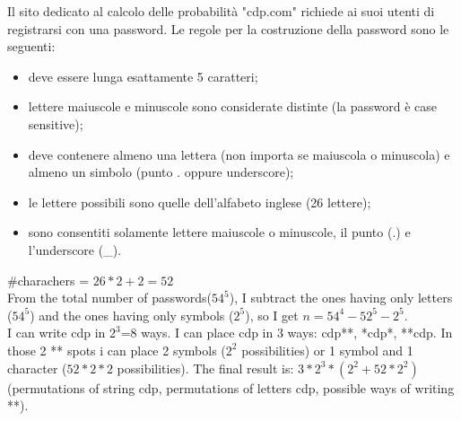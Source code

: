 \begin{example}
    Il sito dedicato al calcolo delle probabilità "cdp.com" richiede ai suoi utenti di registrarsi con una password. Le regole per la costruzione della password sono le seguenti:
    \begin{itemize}
        \item deve essere lunga esattamente 5 caratteri;
        \item lettere maiuscole e minuscole sono considerate distinte (la password è case sensitive);
        \item deve contenere almeno una lettera (non importa se maiuscola o minuscola) e almeno un simbolo (punto . oppure underscore);
        \item le lettere possibili sono quelle dell'alfabeto inglese (26 lettere);
        \item sono consentiti solamente lettere maiuscole o minuscole, il punto (.) e l'underscore (\_).
    \end{itemize}
    \#charachers = $26*2+2=52$\\
    From the total number of passwords($54^5$), I subtract the ones having only letters ($54^5$) and the ones having only symbols ($2^5$), so I get $n=54^4-52^5-2^5$.\\
    I can write cdp in $2^3$=8 ways. I can place cdp in 3 ways: cdp**, *cdp*, **cdp. In those 2 ** spots i can place 2 symbols ($2^2$ possibilities) or 1 symbol and 1 character ($52*2*2$ possibilities). The final result is:
    $3*2^3*(2^2+52*2^2)$ (permutations of string cdp, permutations of letters cdp, possible ways of writing **).
\end{example}